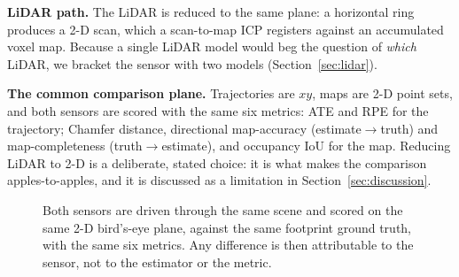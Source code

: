 \documentclass[journal]{IEEEtran}
\begin{document}
\textbf{LiDAR path.} The LiDAR is reduced to the same plane: a horizontal ring produces a
2-D scan, which a scan-to-map ICP registers against an accumulated voxel map. Because a
single LiDAR model would beg the question of \emph{which} LiDAR, we bracket the sensor
with two models (Section~\ref{sec:lidar}).

\textbf{The common comparison plane.} Trajectories are $xy$, maps are 2-D point sets, and
both sensors are scored with the same six metrics: ATE and RPE for the trajectory;
Chamfer distance, directional map-accuracy (estimate$\rightarrow$truth) and
map-completeness (truth$\rightarrow$estimate), and occupancy IoU for the map. Reducing
LiDAR to 2-D is a deliberate, stated choice: it is what makes the comparison
apples-to-apples, and it is discussed as a limitation in Section~\ref{sec:discussion}.

\begin{figure}[t]
\centering
{}
\caption{Both sensors are driven through the same scene and scored on the same 2-D
bird's-eye plane, against the same footprint ground truth, with the same six metrics.
Any difference is then attributable to the sensor, not to the estimator or the metric.}
\label{fig:system}
\end{figure}
\end{document}
